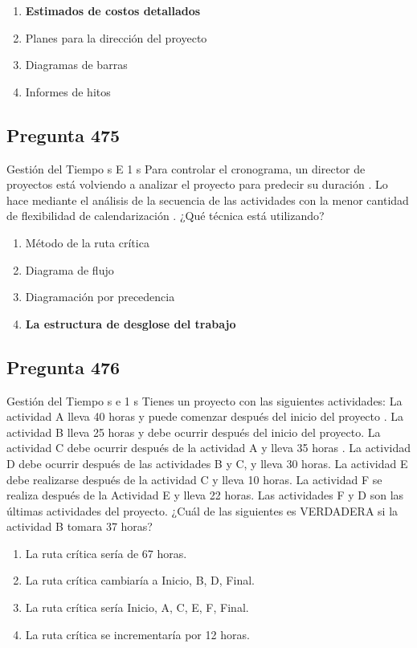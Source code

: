 \documentclass[11pt,a4paper]{article}
\begin{document}
\begin{enumerate}[label=\alph*)]
  \item \textbf{Estimados de costos detallados}
  \item Planes para la dirección del proyecto
  \item Diagramas de barras
  \item Informes de hitos
\end{enumerate}

\subsection*{Pregunta 475}
Gestión del Tiempo s E 1 s Para controlar el cronograma, un director de proyectos está volviendo a analizar el proyecto para predecir su duración . Lo hace mediante el análisis de la secuencia de las actividades con la menor cantidad de flexibilidad de calendarización . ¿Qué técnica está utilizando?

\begin{enumerate}[label=\alph*)]
  \item Método de la ruta crítica
  \item Diagrama de flujo
  \item Diagramación por precedencia
  \item \textbf{La estructura de desglose del trabajo}
\end{enumerate}

\subsection*{Pregunta 476}
Gestión del Tiempo s e 1 s Tienes un proyecto con las siguientes actividades: La actividad A lleva 40 horas y puede comenzar después del inicio del proyecto . La actividad B lleva 25 horas y debe ocurrir después del inicio del proyecto. La actividad C debe ocurrir después de la actividad A y lleva 35 horas . La actividad D debe ocurrir después de las actividades B y C, y lleva 30 horas. La actividad E debe realizarse después de la actividad C y lleva 10 horas. La actividad F se realiza después de la Actividad E y lleva 22 horas. Las actividades F y D son las últimas actividades del proyecto. ¿Cuál de las siguientes es VERDADERA si la actividad B tomara 37 horas?

\begin{enumerate}[label=\alph*)]
  \item La ruta crítica sería de 67 horas.
  \item La ruta crítica cambiaría a Inicio, B, D, Final.
  \item La ruta crítica sería Inicio, A, C, E, F, Final.
  \item La ruta crítica se incrementaría por 12 horas.
\end{enumerate}
\end{document}
